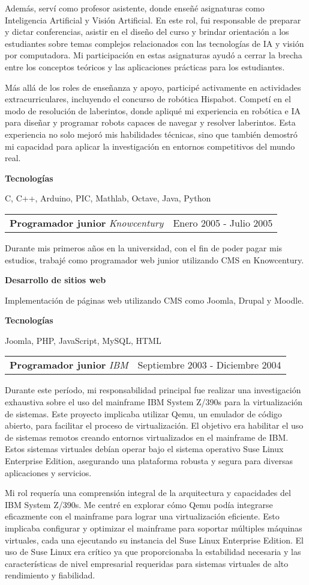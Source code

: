\documentclass[a4paper,10pt]{article}
\makeatletter
\newcommand{\cvsubsection}[3]{
  \begin{tcolorbox}[colback=gray!20, colframe=gray!20, boxrule=0pt, arc=0mm, outer arc=0mm, width=\dimexpr\textwidth-2mm\relax, boxsep=0pt, left=2mm, right=2mm, top=2mm, bottom=2mm]
    \begin{tabular*}{\dimexpr\textwidth-6mm\relax}{p{0.7\textwidth} @{\extracolsep{\fill}} p{0.3\textwidth}}
      \raggedright
      \textbf{#1} \textit{#2} & \raggedleft \small{#3}
    \end{tabular*}
  \end{tcolorbox}
  \vspace{2mm}
}
\newcommand{\cvsubsubsection}[1]{
\begin{tcolorbox}[colback=gray!10, colframe=gray!10, boxrule=0pt, arc=0mm, outer arc=0mm, width=\textwidth, boxsep=0pt, left=4mm, right=4mm, top=1mm, bottom=1mm]
  \textbf{#1}
\end{tcolorbox}
\vspace{1mm}
}
\newcommand{\cvsubsubsubsection}[1]{
  \begin{tcolorbox}[colback=gray!5, colframe=gray!5, boxrule=0pt, arc=0mm, outer arc=0mm, width=\textwidth, boxsep=0pt, left=6mm, right=6mm, top=1mm, bottom=1mm]
    \textbf{#1}
  \end{tcolorbox}
  \vspace{1mm}
}
\makeatother
\begin{document}
Además, serví como profesor asistente, donde enseñé asignaturas como Inteligencia Artificial y Visión Artificial. En este rol, fui responsable de preparar y dictar conferencias, asistir en el diseño del curso y brindar orientación a los estudiantes sobre temas complejos relacionados con las tecnologías de IA y visión por computadora. Mi participación en estas asignaturas ayudó a cerrar la brecha entre los conceptos teóricos y las aplicaciones prácticas para los estudiantes.

Más allá de los roles de enseñanza y apoyo, participé activamente en actividades extracurriculares, incluyendo el concurso de robótica Hispabot. Competí en el modo de resolución de laberintos, donde apliqué mi experiencia en robótica e IA para diseñar y programar robots capaces de navegar y resolver laberintos. Esta experiencia no solo mejoró mis habilidades técnicas, sino que también demostró mi capacidad para aplicar la investigación en entornos competitivos del mundo real.

\cvsubsubsubsection{Tecnologías}
C, C++, Arduino, PIC, Mathlab, Octave, Java, Python

\cvsubsection{Programador junior}{Knowcentury}{Enero 2005 - Julio 2005}
Durante mis primeros años en la universidad, con el fin de poder pagar mis estudios, trabajé como programador web junior utilizando CMS en Knowcentury.

\cvsubsubsection{Desarrollo de sitios web}
Implementación de páginas web utilizando CMS como Joomla, Drupal y Moodle.

\cvsubsubsubsection{Tecnologías}
Joomla, PHP, JavaScript, MySQL, HTML

\cvsubsection{Programador junior}{IBM}{Septiembre 2003 - Diciembre 2004}
Durante este período, mi responsabilidad principal fue realizar una investigación exhaustiva sobre el uso del mainframe IBM System Z/390s para la virtualización de sistemas. Este proyecto implicaba utilizar Qemu, un emulador de código abierto, para facilitar el proceso de virtualización. El objetivo era habilitar el uso de sistemas remotos creando entornos virtualizados en el mainframe de IBM. Estos sistemas virtuales debían operar bajo el sistema operativo Suse Linux Enterprise Edition, asegurando una plataforma robusta y segura para diversas aplicaciones y servicios.

Mi rol requería una comprensión integral de la arquitectura y capacidades del IBM System Z/390s. Me centré en explorar cómo Qemu podía integrarse eficazmente con el mainframe para lograr una virtualización eficiente. Esto implicaba configurar y optimizar el mainframe para soportar múltiples máquinas virtuales, cada una ejecutando su instancia del Suse Linux Enterprise Edition. El uso de Suse Linux era crítico ya que proporcionaba la estabilidad necesaria y las características de nivel empresarial requeridas para sistemas virtuales de alto rendimiento y fiabilidad.
\end{document}
